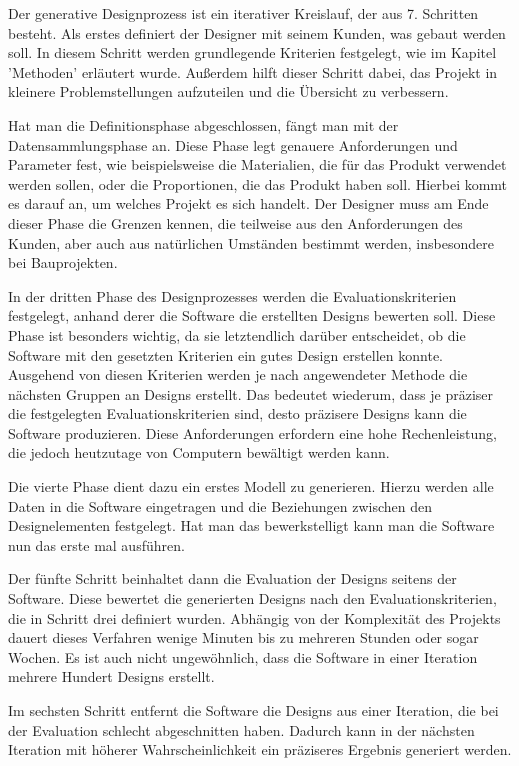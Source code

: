 Der generative Designprozess ist ein iterativer Kreislauf, der aus 7. Schritten besteht. Als erstes definiert der Designer mit seinem Kunden, was gebaut werden soll. In diesem Schritt werden grundlegende Kriterien festgelegt, wie im Kapitel 'Methoden' erläutert wurde. Außerdem hilft dieser Schritt dabei, das Projekt in kleinere Problemstellungen aufzuteilen und die Übersicht zu verbessern.

Hat man die Definitionsphase abgeschlossen, fängt man mit der Datensammlungsphase an. Diese Phase legt genauere Anforderungen und Parameter fest, wie beispielsweise die Materialien, die für das Produkt verwendet werden sollen, oder die Proportionen, die das Produkt haben soll. Hierbei kommt es darauf an, um welches Projekt es sich handelt. Der Designer muss am Ende dieser Phase die Grenzen kennen, die teilweise aus den Anforderungen des Kunden, aber auch aus natürlichen Umständen bestimmt werden, insbesondere bei Bauprojekten.

In der dritten Phase des Designprozesses werden die Evaluationskriterien festgelegt, anhand derer die Software die erstellten Designs bewerten soll. Diese Phase ist besonders wichtig, da sie letztendlich darüber entscheidet, ob die Software mit den gesetzten Kriterien ein gutes Design erstellen konnte. Ausgehend von diesen Kriterien werden je nach angewendeter Methode die nächsten Gruppen an Designs erstellt. Das bedeutet wiederum, dass je präziser die festgelegten Evaluationskriterien sind, desto präzisere Designs kann die Software produzieren. Diese Anforderungen erfordern eine hohe Rechenleistung, die jedoch heutzutage von Computern bewältigt werden kann. 

Die vierte Phase dient dazu ein erstes Modell zu generieren. Hierzu werden alle Daten in die Software eingetragen und die Beziehungen zwischen den Designelementen festgelegt. Hat man das bewerkstelligt kann man die Software nun das erste mal ausführen. 

Der fünfte Schritt beinhaltet dann die Evaluation der Designs seitens der Software. Diese bewertet die generierten Designs nach den Evaluationskriterien, die in Schritt drei definiert wurden. Abhängig von der Komplexität des Projekts dauert dieses Verfahren wenige Minuten bis zu mehreren Stunden oder sogar Wochen. Es ist auch nicht ungewöhnlich, dass die Software in einer Iteration mehrere Hundert Designs erstellt.

Im sechsten Schritt entfernt die Software die Designs aus einer Iteration, die bei der Evaluation schlecht abgeschnitten haben. Dadurch kann in der nächsten Iteration mit höherer Wahrscheinlichkeit ein präziseres Ergebnis generiert werden.

